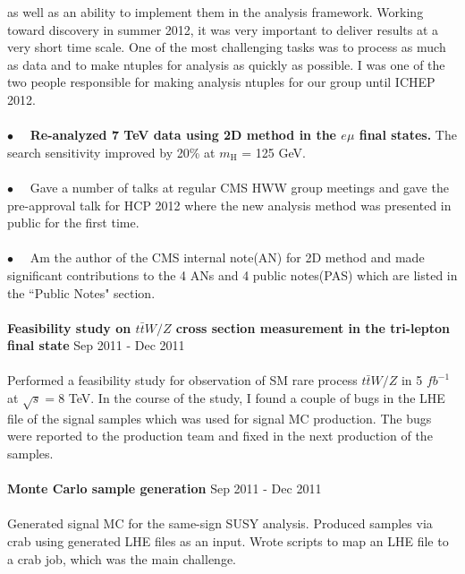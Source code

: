 \documentclass[margin]{res}
\begin{document}
\begin{resume}
      as well as an ability to implement them in the analysis framework.
      Working toward discovery in summer 2012, 
      it was very important to deliver results at a very short time scale. One of the most 
      challenging tasks was to process as much as data and to make ntuples 
      for analysis as quickly as possible. I was one of the two people responsible for 
      making analysis ntuples for our group until ICHEP 2012. 
    \\    
    \\
    $\bullet\quad$  \textbf{Re-analyzed 7 TeV data using 2D method in the $e\mu$ final states.} 
    The search sensitivity improved by 20\% at $m_{\mathrm{H}}$ = 125 GeV.  
    \\  
    \\
    $\bullet\quad$  Gave a number of talks at regular CMS HWW group meetings 
      and gave the pre-approval talk for HCP 2012 where  
      the new analysis method was presented in public for the first time.
    \\
    \\
    $\bullet\quad$  Am the author of the CMS internal note(AN) for 2D method and 
    made significant contributions to the 4 ANs and 4 public notes(PAS) which are 
    listed in the ``Public Notes" section.   
    \\
    \\
\textbf{Feasibility study on $t\bar{t}W/Z$ cross section measurement in the tri-lepton final state} 
        \hfill Sep 2011 - Dec 2011 
     \\
     \\
     Performed a feasibility study for observation of SM rare process $t\bar{t}W/Z$ 
     in 5 $fb^{-1}$ at $\sqrt{s}=8$ TeV.  
     In the course of the study, I found a couple of bugs in the LHE file of the signal samples 
     which was used for signal MC production. The bugs were reported to the production team 
     and fixed in the next production of the samples.
     \\
     \\
\textbf{Monte Carlo sample generation} 
       \hfill Sep 2011 - Dec 2011 
     \\                
     \\                
     Generated signal MC for the same-sign SUSY analysis. Produced samples via crab using 
     generated LHE files as an input. 
     Wrote scripts to map an LHE file to a crab job, which was the main challenge.  
     \\                

\end{resume}
\end{document}
